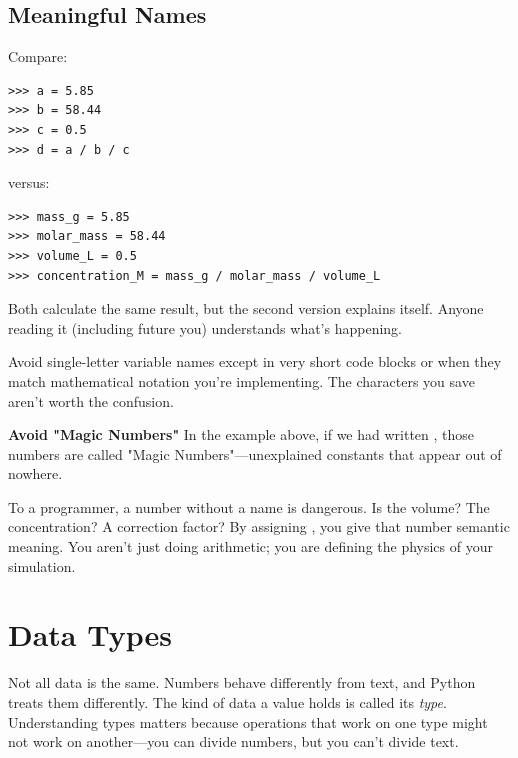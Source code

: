 \subsection{Meaningful Names}

Compare:

\begin{lstlisting}
>>> a = 5.85
>>> b = 58.44
>>> c = 0.5
>>> d = a / b / c
\end{lstlisting}

versus:

\begin{lstlisting}
>>> mass_g = 5.85
>>> molar_mass = 58.44
>>> volume_L = 0.5
>>> concentration_M = mass_g / molar_mass / volume_L
\end{lstlisting}

Both calculate the same result, but the second version explains itself. Anyone reading it (including future you) understands what's happening.

\begin{warning}
Avoid single-letter variable names except in very short code blocks or when they match mathematical notation you're implementing. The characters you save aren't worth the confusion.
\end{warning}

\begin{warning}
\textbf{Avoid "Magic Numbers"}
In the example above, if we had written , those numbers are called "Magic Numbers"---unexplained constants that appear out of nowhere.

To a programmer, a number without a name is dangerous. Is  the volume? The concentration? A correction factor? By assigning , you give that number semantic meaning. You aren't just doing arithmetic; you are defining the physics of your simulation.
\end{warning}

\section{Data Types}
\label{sec:types}

Not all data is the same. Numbers behave differently from text, and Python treats them differently. The kind of data a value holds is called its \emph{type}. Understanding types matters because operations that work on one type might not work on another---you can divide numbers, but you can't divide text.


